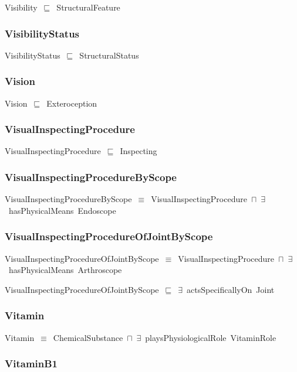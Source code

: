 \documentclass{article}
\begin{document}
Visibility~\ensuremath{\sqsubseteq}~StructuralFeature~

\subsubsection*{VisibilityStatus}

VisibilityStatus~\ensuremath{\sqsubseteq}~StructuralStatus~

\subsubsection*{Vision}

Vision~\ensuremath{\sqsubseteq}~Exteroception~

\subsubsection*{VisualInspectingProcedure}

VisualInspectingProcedure~\ensuremath{\sqsubseteq}~Inspecting~

\subsubsection*{VisualInspectingProcedureByScope}

VisualInspectingProcedureByScope~\ensuremath{\equiv}~VisualInspectingProcedure~\ensuremath{\sqcap}~\ensuremath{\exists}~hasPhysicalMeans~Endoscope

\subsubsection*{VisualInspectingProcedureOfJointByScope}

VisualInspectingProcedureOfJointByScope~\ensuremath{\equiv}~VisualInspectingProcedure~\ensuremath{\sqcap}~\ensuremath{\exists}~hasPhysicalMeans~Arthroscope

VisualInspectingProcedureOfJointByScope~\ensuremath{\sqsubseteq}~\ensuremath{\exists}~actsSpecificallyOn~Joint~

\subsubsection*{Vitamin}

Vitamin~\ensuremath{\equiv}~ChemicalSubstance~\ensuremath{\sqcap}~\ensuremath{\exists}~playsPhysiologicalRole~VitaminRole

\subsubsection*{VitaminB1}
\end{document}
